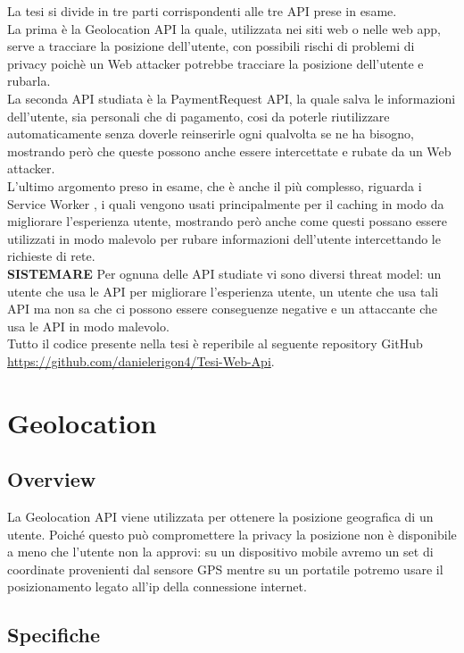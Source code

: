 \documentclass[11pt ,a4paper , twoside , openright ]{article}
\begin{document}
La tesi si divide in tre parti corrispondenti alle tre API prese in esame. 
\\
La prima è la Geolocation API la quale, utilizzata nei siti web o nelle web app, serve a tracciare la posizione dell'utente, con possibili rischi di problemi di privacy poichè un Web attacker potrebbe tracciare la posizione dell'utente e rubarla.
\\
La seconda API studiata è la PaymentRequest API, la quale salva le informazioni dell'utente, sia personali che di pagamento, cosi da poterle riutilizzare automaticamente senza doverle reinserirle ogni qualvolta se ne ha bisogno, mostrando però che queste possono anche essere intercettate e rubate da un Web attacker.
\\
L'ultimo argomento preso in esame, che è anche il più complesso, riguarda i Service Worker \cite{rif3}, i quali vengono usati principalmente per il caching in modo da migliorare l'esperienza utente, mostrando però anche come questi possano essere utilizzati in modo malevolo per rubare informazioni dell'utente intercettando le richieste di rete.
\\
\textbf{SISTEMARE}
Per ognuna delle API studiate vi sono diversi threat model: un utente che usa le API per migliorare l'esperienza utente, un utente che usa tali API ma non sa che ci possono essere conseguenze negative e un attaccante che usa le API in modo malevolo.
\\
Tutto il codice presente nella tesi è reperibile al seguente repository GitHub \url{https://github.com/danielerigon4/Tesi-Web-Api}.
\cleardoublepage


\section{Geolocation}
\subsection{Overview}
La Geolocation API viene utilizzata per ottenere la posizione geografica di un utente. 
Poiché questo può compromettere la privacy la posizione non è disponibile a meno che l'utente non la approvi: su un dispositivo mobile avremo un set di coordinate provenienti dal sensore GPS mentre su un portatile potremo usare il posizionamento legato all’ip della connessione internet.
\subsection{Specifiche}
\end{document}
